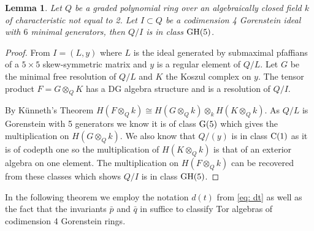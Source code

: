 \documentclass[reqno]{amsart}
\newcommand{\G}{{\rm G}}
\newcommand{\C}{{\rm C}}
\newcommand{\GH}{{\rm GH}}
\theoremstyle{plain} %
\newtheorem{lemma}[theorem]{Lemma}
\theoremstyle{definition}
\theoremstyle{remark}
\begin{document}
\begin{lemma}\label{6-gens}
    Let $Q$ be a graded polynomial ring over an algebraically closed field $k$ of characteristic not equal to 2. 
    Let $I\subset Q$ be a codimension 4 Gorenstein ideal with $6$ minimal generators, then $Q/I$ is in class $\GH(5)$. 
\end{lemma}
\begin{proof}
  From  \cite{Gor_Six_Gen} $I=(L,y)$ where $L$ is the ideal generated by submaximal pfaffians of a $5\times 5$ skew-symmetric matrix and $y$ is a regular element of $Q/L$. Let $G$ be the minimal free resolution of $Q/L$ and $K$ the Koszul complex on $y$. The tensor product $F=G\otimes_QK$ has a DG algebra structure and is a resolution of $Q/I$. 
  
  By K\"unneth's Theorem $H(F\otimes_Q k)\cong H(G\otimes_Q k)\otimes_k H(K\otimes_Q k)$. As $Q/L$ is Gorenstein with 5 generators we know it is of class $\G(5)$ which gives the multiplication on $H(G\otimes_Q k)$. We also know that $Q/(y)$ is in class $\C(1)$ as it is of codepth one so the multiplication of $H(K\otimes_Q k)$ is that of an exterior algebra on one element. The multiplication on $H(F\otimes_Q k)$ can be recovered from these classes which shows $Q/I$ is in class $\GH(5)$. 


\end{proof}

In the following theorem we employ the notation $d(t)$ from \eqref{eq: dt} as well as the fact that the invariants $\bar{p}$ and $\bar{q}$ in 
 suffice to classify Tor algebras of codimension 4 Gorenstein rings.
\end{document}
